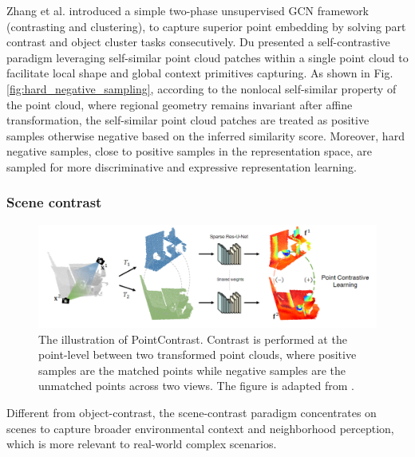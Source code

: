 \documentclass[a4paper,fleqn]{cas-dc}
\begin{document}
Zhang et al. \citep{zhang2019unsupervised} introduced a simple two-phase unsupervised GCN framework (contrasting and clustering), to capture superior point embedding by solving part contrast and object cluster tasks consecutively. Du \citep{du2021self} presented a self-contrastive paradigm leveraging self-similar point cloud patches within a single point cloud to facilitate local shape and global context primitives capturing. As shown in Fig. \ref{fig:hard_negative_sampling}, according to the nonlocal self-similar property of the point cloud, where regional geometry remains invariant after affine transformation, the self-similar point cloud patches are treated as positive samples otherwise negative based on the inferred similarity score. Moreover, hard negative samples, close to positive samples in the representation space, are sampled for more discriminative and expressive representation learning.

    

\subsubsection{Scene contrast}

\begin{figure}[htbp]
    \centering
    \includegraphics[width=0.97\linewidth]{point_contrast.png}
    \caption{The illustration of PointContrast. Contrast is performed at the point-level between two transformed point clouds, where positive samples are the matched points while negative samples are the unmatched points across two views. The figure is adapted from \citep{xie2020pointcontrast}.}
    \label{fig:pointcontrast}
\end{figure}

Different from object-contrast, the scene-contrast paradigm concentrates on scenes to capture broader environmental context and neighborhood perception, which is more relevant to real-world complex scenarios.
\end{document}
